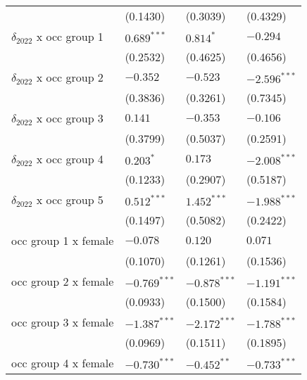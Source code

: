 \begin{tabular}{llll}
                                       &           (0.1430) &           (0.3039) &           (0.4329) \\
$\delta_{2022}$ x occ group 1          &      $0.689^{***}$ &          $0.814^*$ &           $-0.294$ \\
                                       &           (0.2532) &           (0.4625) &           (0.4656) \\
$\delta_{2022}$ x occ group 2          &           $-0.352$ &           $-0.523$ &     $-2.596^{***}$ \\
                                       &           (0.3836) &           (0.3261) &           (0.7345) \\
$\delta_{2022}$ x occ group 3          &            $0.141$ &           $-0.353$ &           $-0.106$ \\
                                       &           (0.3799) &           (0.5037) &           (0.2591) \\
$\delta_{2022}$ x occ group 4          &          $0.203^*$ &            $0.173$ &     $-2.008^{***}$ \\
                                       &           (0.1233) &           (0.2907) &           (0.5187) \\
$\delta_{2022}$ x occ group 5          &      $0.512^{***}$ &      $1.452^{***}$ &     $-1.988^{***}$ \\
                                       &           (0.1497) &           (0.5082) &           (0.2422) \\
occ group 1 x female                   &           $-0.078$ &            $0.120$ &            $0.071$ \\
                                       &           (0.1070) &           (0.1261) &           (0.1536) \\
occ group 2 x female                   &     $-0.769^{***}$ &     $-0.878^{***}$ &     $-1.191^{***}$ \\
                                       &           (0.0933) &           (0.1500) &           (0.1584) \\
occ group 3 x female                   &     $-1.387^{***}$ &     $-2.172^{***}$ &     $-1.788^{***}$ \\
                                       &           (0.0969) &           (0.1511) &           (0.1895) \\
occ group 4 x female                   &     $-0.730^{***}$ &      $-0.452^{**}$ &     $-0.733^{***}$ \\

\end{tabular}
